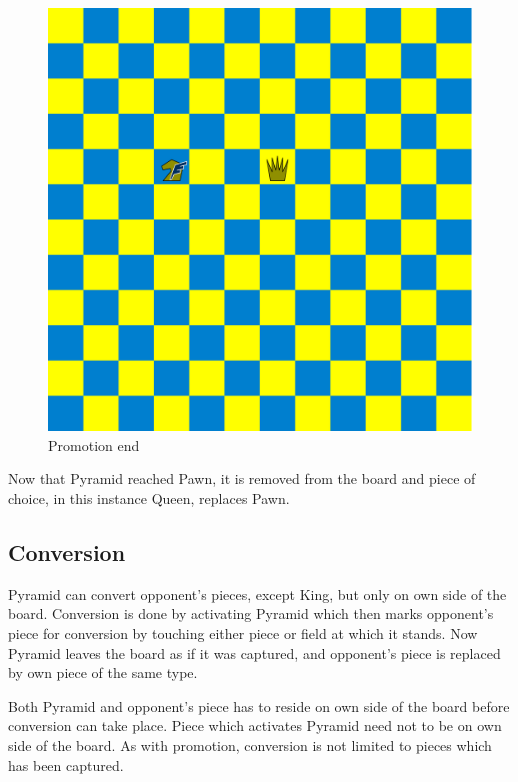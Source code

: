\documentclass[a5paper,12pt,draft]{book} %
\begin{document}
\noindent
\begin{figure}[!h]
\includegraphics[width=1.0\textwidth, keepaspectratio=true]{../gfx/examples/06_move_pyramid_promo_end.png}
\caption{Promotion end}
\label{fig:ma_promo_end}
\end{figure}

Now that Pyramid reached Pawn, it is removed from the board and piece of choice,
in this instance Queen, replaces Pawn.

\clearpage

\subsection*{Conversion}

\indent
Pyramid can convert opponent's pieces, except King, but only on own side of
the board. Conversion is done by activating Pyramid which then marks opponent's
piece for conversion by touching either piece or field at which it stands. Now
Pyramid leaves the board as if it was captured, and opponent's piece is replaced
by own piece of the same type.

Both Pyramid and opponent's piece has to reside on own side of the board
before conversion can take place. Piece which activates Pyramid need not
to be on own side of the board. As with promotion, conversion is not limited
to pieces which has been captured.
\end{document}
